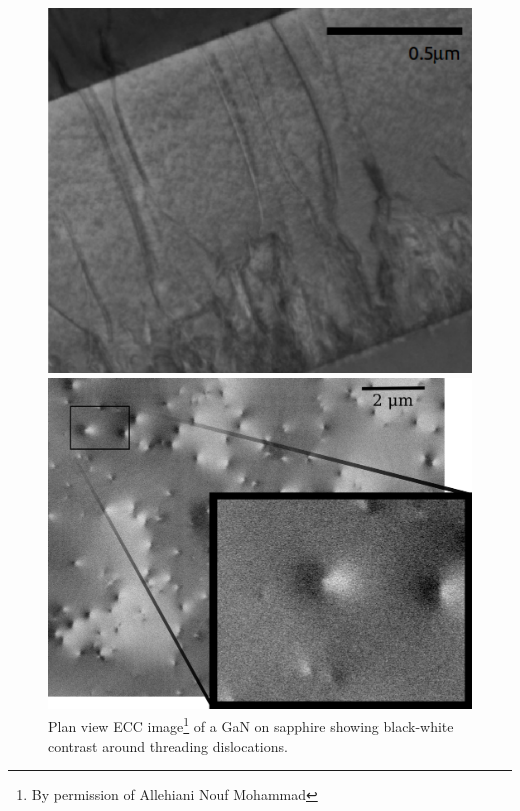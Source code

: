 \begin{figure}
\centering
\noindent\begin{minipage}{0.47\textwidth}
    \centering
    \includegraphics[width=0.9\linewidth, height=0.25\textheight]{Figures/TEM.png}
    \captionsetup{width=0.8\linewidth}
    \caption[AlGaN TEM.]{Transversal TEM image\footnote{Taken at the KNC, University of Glasgow. ~~By permission of David Thomson} of an AlGaN on sapphire showing threading dislocations reaching an interface.}
     \label{fig:tem}
\end{minipage}
\;\;\;
\begin{minipage}{0.48\textwidth}
     \centering
     \includegraphics[width=0.9\linewidth, height=0.25\textheight]{Figures/ECCI.png}
      \captionsetup{width=0.8\linewidth}
     \caption[GaN ECCI.]{Plan view ECC image\footnote{By permission of Allehiani Nouf Mohammad} of a \hkl[0001] GaN on sapphire showing black-white contrast around threading dislocations.}
     \label{fig:ecci}
\end{minipage}
\end{figure}

